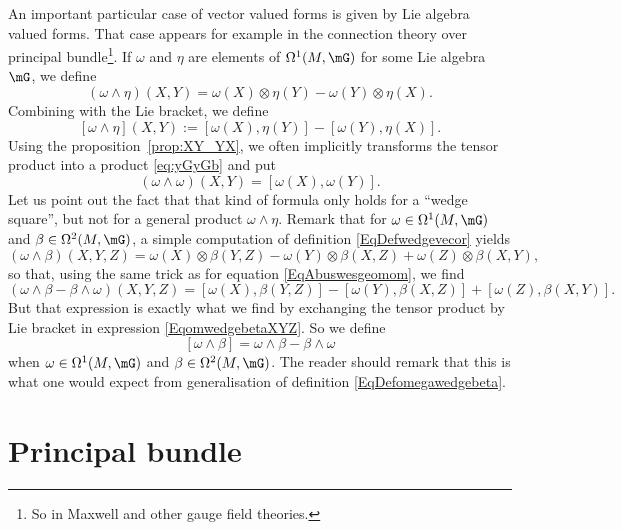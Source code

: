 An important particular case of vector valued forms is given by Lie algebra valued forms. That case appears for example in the connection theory over principal bundle\footnote{So in Maxwell and other gauge field theories.}. If $\omega$ and $\eta$ are elements of $\Omega^1(M,\mG)$ for some Lie algebra $\mG$, we define
\[
	(\omega\wedge\eta)(X,Y)=\omega(X)\otimes\eta(Y)-\omega(Y)\otimes\eta(X).
\]
Combining with the Lie bracket, we define
\begin{equation}	\label{EqDefomegawedgebeta}
	[\omega\wedge\eta](X,Y):=[\omega(X),\eta(Y)]-[\omega(Y),\eta(X)].
\end{equation}
Using the proposition~\ref{prop:XY_YX}, we often implicitly transforms the tensor product into a product \eqref{eq:yGyGb} and put
\begin{equation}	\label{EqAbuswesgeomom}
	(\omega\wedge\omega)(X,Y)=[\omega(X),\omega(Y)].
\end{equation}
Let us point out the fact that that kind of formula only holds for a ``wedge square'', but not for a general product $\omega\wedge\eta$. Remark that for $\omega\in\Omega^1(M,\mG)$ and $\beta\in\Omega^2(M,\mG)$, a simple computation of definition \eqref{EqDefwedgevecor} yields
\begin{equation}	\label{EqomwedgebetaXYZ}
	(\omega\wedge\beta)(X,Y,Z)=\omega(X)\otimes\beta(Y,Z)-\omega(Y)\otimes\beta(X,Z)+\omega(Z)\otimes\beta(X,Y),
\end{equation}
so that, using the same trick as for equation \eqref{EqAbuswesgeomom}, we find
\[
	(\omega\wedge\beta-\beta\wedge\omega)(X,Y,Z)=[\omega(X),\beta(Y,Z)]-[\omega(Y),\beta(X,Z)]+[\omega(Z),\beta(X,Y)].
\]
But that expression is exactly what we find by exchanging the tensor product by Lie bracket in expression \eqref{EqomwedgebetaXYZ}. So we define
\begin{equation}	\label{EqDefCrochwedgedeux}
	[\omega\wedge\beta]=\omega\wedge\beta-\beta\wedge\omega
\end{equation}
when $\omega\in\Omega^1(M,\mG)$ and $\beta\in\Omega^2(M,\mG)$. The reader should remark that this is what one would expect from generalisation of definition \eqref{EqDefomegawedgebeta}.
\section{Principal bundle}

